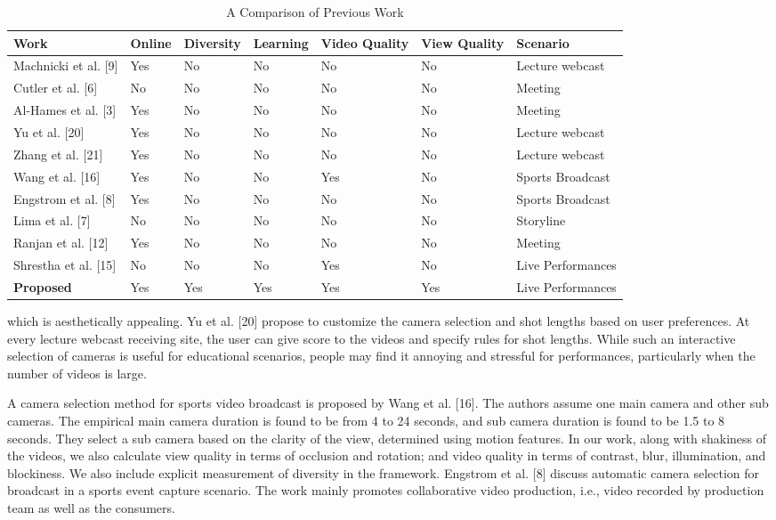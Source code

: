\documentclass{sig-alternate}
\begin{document}
\begin{table*}
\centering
\caption{A Comparison of Previous Work}
\begin{tabular}{l|l|l|l|l|l|l} \hline
Work& Online& Diversity& Learning& Video Quality& View Quality& Scenario\\ \hline
Machnicki et al. [9]& Yes& No& No& No& No& Lecture webcast\\ \hline
Cutler et al. [6]& No& No& No& No& No& Meeting\\ \hline
Al-Hames et al. [3]& Yes& No& No& No& No& Meeting\\ \hline
Yu et al. [20]& Yes& No& No& No& No& Lecture webcast\\ \hline
Zhang et al. [21]& Yes& No& No& No& No& Lecture webcast\\ \hline
Wang et al. [16]& Yes& No& No& Yes& No& Sports Broadcast\\ \hline
Engstrom et al. [8]& Yes& No& No& No& No& Sports Broadcast\\ \hline
Lima et al. [7]& No& No& No& No& No& Storyline\\ \hline
Ranjan et al. [12]& Yes& No& No& No& No& Meeting\\ \hline
Shrestha et al. [15]& No& No& No& Yes& No& Live Performances\\ \hline
\textbf{Proposed}& Yes& Yes& Yes& Yes& Yes& Live Performances\\ \hline
\end{tabular}
\end{table*}
which is aesthetically appealing. Yu et
al. [20] propose to customize the camera selection and shot lengths
based on user preferences. At every lecture webcast receiving site,
the user can give score to the videos and specify rules for shot
lengths. While such an interactive selection of cameras is useful
for educational scenarios, people may find it annoying and stressful
for performances, particularly when the number of videos is
large.

A camera selection method for sports video broadcast is proposed
by Wang et al. [16]. The authors assume one main camera
and other sub cameras. The empirical main camera duration is
found to be from 4 to 24 seconds, and sub camera duration is found
to be 1.5 to 8 seconds. They select a sub camera based on the clarity
of the view, determined using motion features. In our work,
along with shakiness of the videos, we also calculate view quality
in terms of occlusion and rotation; and video quality in terms
of contrast, blur, illumination, and blockiness. We also include
explicit measurement of diversity in the framework. Engstrom et
al. [8] discuss automatic camera selection for broadcast in a sports
event capture scenario. The work mainly promotes collaborative
video production, i.e., video recorded by production team as well
as the consumers.
\end{document}
